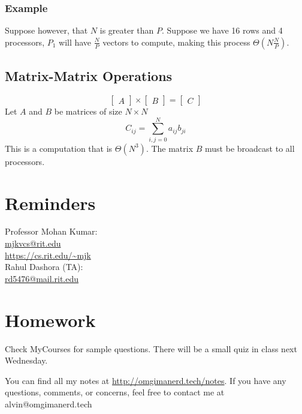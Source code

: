 \documentclass[letterpaper, 12pt]{math}
\begin{document}
\subsubsection*{Example}
Suppose however, that \( N \) is greater than \( P \). Suppose we have 16 rows
and 4 processors, \( P_1 \) will have \( \frac{N}{P} \) vectors to compute,
making this process \( \Theta(N\frac{N}{P}) \).

\subsection*{Matrix-Matrix Operations}
\[ \begin{bmatrix}A\end{bmatrix}\times
  \begin{bmatrix}B\end{bmatrix} = \begin{bmatrix}C\end{bmatrix} \]
Let \( A \) and \( B \) be matrices of size \( N\times N \)
\[ C_{ij} = \sum_{i,j=0}^{N}a_{ij}b_{ji} \]
This is a computation that is \( \Theta(N^3) \). The matrix \( B \) must be
broadcast to all processors.

\section*{Reminders}
Professor Mohan Kumar: \\
\url{mjkvcs@rit.edu} \\
\url{https://cs.rit.edu/~mjk} \\

\noindent Rahul Dashora (TA): \\
\url{rd5476@mail.rit.edu}

\section*{Homework}
Check MyCourses for sample questions. There will be a small quiz in class
next Wednesday.

\begin{center}
  You can find all my notes at \url{http://omgimanerd.tech/notes}. If you have
  any questions, comments, or concerns, feel free to contact me at
  alvin@omgimanerd.tech
\end{center}
\end{document}

